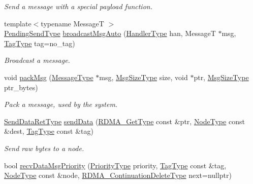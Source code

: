 \begin{DoxyCompactItemize}
\begin{DoxyCompactList}\small\item\em Send a message with a special payload function. \end{DoxyCompactList}\item 
{\footnotesize template$<$typename MessageT $>$ }\\\hyperlink{structvt_1_1messaging_1_1_active_messenger_a3626a6ca76d8ad4ec7c3b47a2c70d3a8}{Pending\+Send\+Type} \hyperlink{group__sendpayload_ga594e99da7cb1a02587b21646679b2936}{broadcast\+Msg\+Auto} (\hyperlink{namespacevt_af64846b57dfcaf104da3ef6967917573}{Handler\+Type} han, MessageT $\ast$msg, \hyperlink{namespacevt_a84ab281dae04a52a4b243d6bf62d0e52}{Tag\+Type} tag=no\+\_\+tag)
\begin{DoxyCompactList}\small\item\em Broadcast a message. \end{DoxyCompactList}\item 
void \hyperlink{structvt_1_1messaging_1_1_active_messenger_a9799bd2681540170faa04b424d3c849e}{pack\+Msg} (\hyperlink{structvt_1_1messaging_1_1_active_messenger_a720a2b1e7462d414b2a51d9fe005eca9}{Message\+Type} $\ast$msg, \hyperlink{namespacevt_abfa009d900299ac1df967b40ea8f2c8a}{Msg\+Size\+Type} size, void $\ast$ptr, \hyperlink{namespacevt_abfa009d900299ac1df967b40ea8f2c8a}{Msg\+Size\+Type} ptr\+\_\+bytes)
\begin{DoxyCompactList}\small\item\em Pack a message, used by the system. \end{DoxyCompactList}\item 
\hyperlink{structvt_1_1messaging_1_1_active_messenger_a839987e944b6b9c681bc56efbea1f220}{Send\+Data\+Ret\+Type} \hyperlink{structvt_1_1messaging_1_1_active_messenger_ac4385fea0c9cc860b5af24fea2f89a1d}{send\+Data} (\hyperlink{namespacevt_a1cab7f4860f65a49ad2c042d6240f288}{R\+D\+M\+A\+\_\+\+Get\+Type} const \&ptr, \hyperlink{namespacevt_a866da9d0efc19c0a1ce79e9e492f47e2}{Node\+Type} const \&dest, \hyperlink{namespacevt_a84ab281dae04a52a4b243d6bf62d0e52}{Tag\+Type} const \&tag)
\begin{DoxyCompactList}\small\item\em Send raw bytes to a node. \end{DoxyCompactList}\item 
bool \hyperlink{structvt_1_1messaging_1_1_active_messenger_ac4d614d118396fa51ba7f2634e2653fa}{recv\+Data\+Msg\+Priority} (\hyperlink{namespacevt_a86bff9f556eb761b27fc8600d006ac04}{Priority\+Type} priority, \hyperlink{namespacevt_a84ab281dae04a52a4b243d6bf62d0e52}{Tag\+Type} const \&tag, \hyperlink{namespacevt_a866da9d0efc19c0a1ce79e9e492f47e2}{Node\+Type} const \&node, \hyperlink{namespacevt_a4dfad0b5809d9812d60a0311a45ae0c2}{R\+D\+M\+A\+\_\+\+Continuation\+Delete\+Type} next=nullptr)

\end{DoxyCompactItemize}
